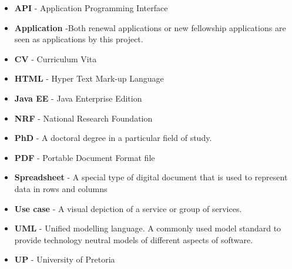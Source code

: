 \documentclass[12pt]{article}
\begin{document}
\begin{itemize}

\item \textbf{API} - Application Programming Interface
\item \textbf{Application} -Both renewal applications or new fellowship applications are seen as applications by this project.
\item \textbf{CV} - Curriculum Vita
\item \textbf{HTML} - Hyper Text Mark-up Language
\item \textbf{Java EE} - Java Enterprise Edition
\item \textbf{NRF} - National Research Foundation
\item \textbf{PhD} - A doctoral degree in a particular field of study.
\item \textbf{PDF} - Portable Document Format file
\item \textbf{Spreadsheet} - A special type of digital document that is used to represent data in rows and columns
\item \textbf{Use case} - A visual depiction of a service or group of services.
\item \textbf{UML} - Unified modelling language. A commonly used model standard to provide technology neutral models of different aspects of software.
\item \textbf{UP} - University of Pretoria
 


\end{itemize}	
\end{document}
